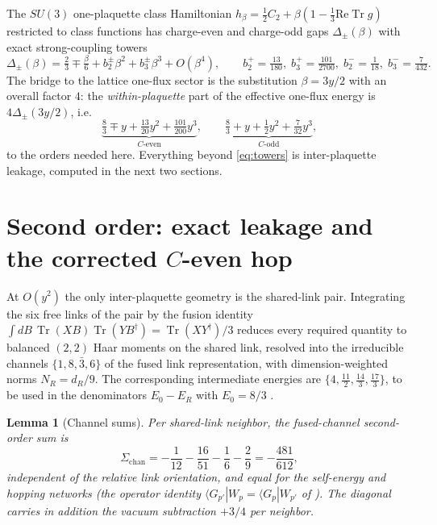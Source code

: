 \documentclass[11pt]{article}
\newtheorem{lemma}[theorem]{Lemma}
\newcommand{\Tr}{\operatorname{Tr}}
\newcommand{\bra}[1]{\langle #1|}
\begin{document}
The $SU(3)$ one-plaquette class Hamiltonian
$h_\beta=\tfrac12 C_2+\beta(1-\tfrac13\mathrm{Re}\Tr g)$ restricted to class
functions has charge-even and charge-odd gaps $\Delta_\pm(\beta)$ with exact
strong-coupling towers \cite{companion}
\begin{equation}
\Delta_\pm(\beta)=\tfrac23 \mp \tfrac{\beta}{6}
+ b_2^\pm\beta^2 + b_3^\pm\beta^3 + O(\beta^4),
\qquad
b_2^+=\tfrac{13}{180},\; b_3^+=\tfrac{101}{2700},\;
b_2^-=\tfrac{1}{18},\; b_3^-=\tfrac{7}{432}.
\end{equation}
The bridge to the lattice one-flux sector is the substitution
$\beta=3y/2$ with an overall factor $4$: the \emph{within-plaquette} part of
the effective one-flux energy is $4\Delta_\pm(3y/2)$, i.e.
\begin{equation}
\underbrace{\tfrac83 \mp y + \tfrac{13}{20}y^2 + \tfrac{101}{200}y^3}_{C\text{-even}},
\qquad
\underbrace{\tfrac83 + y + \tfrac12 y^2 + \tfrac{7}{32}y^3}_{C\text{-odd}},
\label{eq:towers}
\end{equation}
to the orders needed here. Everything beyond \eqref{eq:towers} is
inter-plaquette leakage, computed in the next two sections.

\section{Second order: exact leakage and the corrected $C$-even hop}
\label{sec:leakage}

At $O(y^2)$ the only inter-plaquette geometry is the shared-link pair.
Integrating the six free links of the pair by the fusion identity
$\int dB\,\Tr(XB)\Tr(YB^\dagger)=\Tr(XY^\dagger)/3$ reduces every required
quantity to balanced $(2,2)$ Haar moments on the shared link, resolved into
the irreducible channels $\{1,8,\bar3,6\}$ of the fused link representation,
with dimension-weighted norms $N_R=d_R/9$. The corresponding intermediate
energies are $\{4,\tfrac{11}{2},\tfrac{14}{3},\tfrac{17}{3}\}$, to be used
in the denominators $E_0-E_R$ with $E_0=8/3$ \cite{companion}.

\begin{lemma}[Channel sums]\label{lem:channels}
Per shared-link neighbor, the fused-channel second-order sum is
\begin{equation}
\Sigma_{\mathrm{chan}}
=-\frac{1}{12}-\frac{16}{51}-\frac16-\frac29=-\frac{481}{612},
\end{equation}
independent of the relative link orientation, and equal for the self-energy
and hopping networks (the operator identity
$\bra{G_{p'}}W_p=\bra{G_p}W_{p'}$ of \cite{companion}). The diagonal carries
in addition the vacuum subtraction $+3/4$ per neighbor.
\end{lemma}
\end{document}

